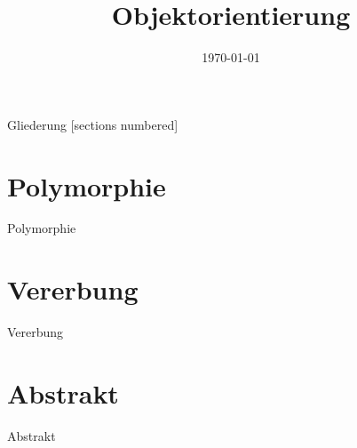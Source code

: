 



\title{Objektorientierung}
\date{\today}




\maketitle

\begin{frame}{Gliederung}
	[sections numbered]
	\tableofcontents
\end{frame}

\section{Polymorphie}
\begin{frame}{Polymorphie}
	\
\end{frame}

\section{Vererbung}
\begin{frame}{Vererbung}

\end{frame}

\section{Abstrakt}
\begin{frame}{Abstrakt}

\end{frame}


